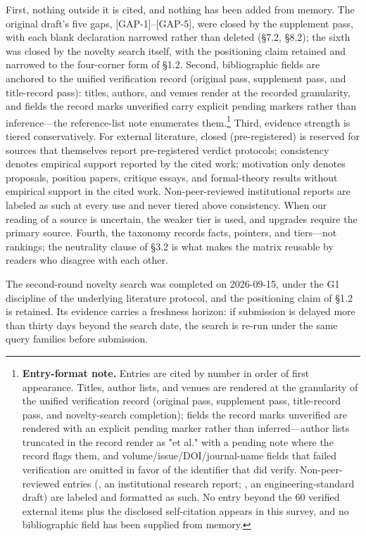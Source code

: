 \documentclass[11pt,a4paper]{article}
\begin{document}
First, nothing outside it is cited, and nothing has been added from memory. The original draft's five gaps, [GAP-1]–[GAP-5], were closed by the supplement pass, with each blank declaration narrowed rather than deleted (§7.2, §8.2); the sixth was closed by the novelty search itself, with the positioning claim retained and narrowed to the four-corner form of §1.2. Second, bibliographic fields are anchored to the unified verification record (original pass, supplement pass, and title-record pass): titles, authors, and venues render at the recorded granularity, and fields the record marks unverified carry explicit pending markers rather than inference—the reference-list note enumerates them.\footnote{\textbf{Entry-format note.} Entries are cited by number in order of first appearance. Titles, author lists, and venues are rendered at the granularity of the unified verification record (original pass, supplement pass, title-record pass, and novelty-search completion); fields the record marks unverified are rendered with an explicit pending marker rather than inferred—author lists truncated in the record render as "et al." with a pending note where the record flags them, and volume/issue/DOI/journal-name fields that failed verification are omitted in favor of the identifier that did verify. Non-peer-reviewed entries (\cite{key31}, an institutional research report; \cite{key51}, an engineering-standard draft) are labeled and formatted as such. No entry beyond the 60 verified external items plus the disclosed self-citation \cite{key04} appears in this survey, and no bibliographic field has been supplied from memory.} Third, evidence strength is tiered conservatively. For external literature, closed (pre-registered) is reserved for sources that themselves report pre-registered verdict protocols; consistency denotes empirical support reported by the cited work; motivation only denotes proposals, position papers, critique essays, and formal-theory results without empirical support in the cited work. Non-peer-reviewed institutional reports are labeled as such at every use and never tiered above consistency. When our reading of a source is uncertain, the weaker tier is used, and upgrades require the primary source. Fourth, the taxonomy records facts, pointers, and tiers—not rankings; the neutrality clause of §3.2 is what makes the matrix reusable by readers who disagree with each other.

The second-round novelty search was completed on 2026-09-15, under the G1 discipline of the underlying literature protocol, and the positioning claim of §1.2 is retained. Its evidence carries a freshness horizon: if submission is delayed more than thirty days beyond the search date, the search is re-run under the same query families before submission.
\end{document}
